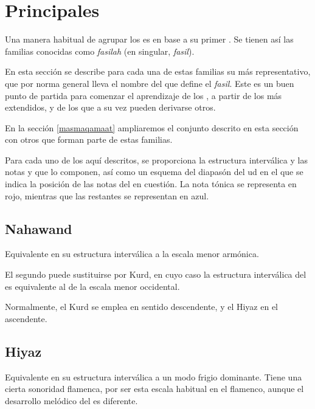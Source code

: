 \section{Principales \maqamaat}

Una manera habitual de agrupar los \maqamaat es en base a su primer \yinsb. Se tienen así las familias conocidas como \emph{fasilah} (en singular, \emph{fasil}).

En esta sección se describe para cada una de estas familias su \maqam más representativo, que por norma general lleva el nombre del \yins que define el \emph{fasil}. Este es un buen punto de partida para comenzar el aprendizaje de los \maqamaatb, a partir de los más extendidos, y de los que a su vez pueden derivarse otros.

En la sección \ref{masmaqamaat} ampliaremos el conjunto descrito en esta sección con otros \maqamaat que forman parte de estas familias.

Para cada uno de los \maqamaat aquí descritos, se proporciona la estructura interválica y las notas y \ashnas que lo componen, así como un esquema del diapasón del ud en el que se indica la posición de las notas del \maqam en cuestión. La nota tónica se representa en rojo, mientras que las restantes se representan en azul.

\subsection{\Maqam Nahawand}

Equivalente en su estructura interválica a la escala menor armónica.



El segundo \yins puede sustituirse por \yins Kurd, en cuyo caso la estructura interválica del \maqam es equivalente al de la escala menor occidental.



Normalmente, el \yins Kurd se emplea en sentido descendente, y el \yins Hiyaz en el ascendente.

\subsection{\Maqam Hiyaz}

Equivalente en su estructura interválica a un modo frigio dominante. Tiene una cierta sonoridad flamenca, por ser esta escala habitual en el flamenco, aunque el desarrollo melódico del \maqam es diferente.

